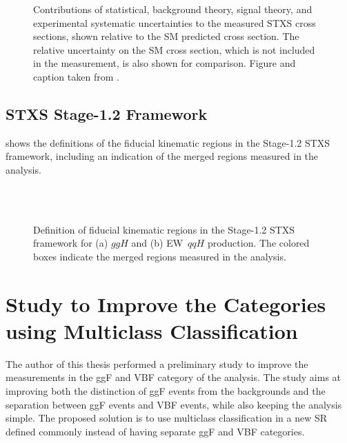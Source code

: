     \begin{figure}[h]
        \centering
        \caption[Contributions of statistical, background theory, signal theory, and experimental systematic uncertainties to the measured STXS cross sections.]{Contributions of statistical, background theory, signal theory, and experimental systematic uncertainties to the measured STXS cross sections, shown relative to the SM predicted cross section. The relative uncertainty on the SM cross section, which is not included in the measurement, is also shown for comparison.
        Figure and caption taken from .
        }
        \label{app:fig:stxs:uncertainty-breakdown}
    \end{figure}

    \clearpage
    \FloatBarrier
    \section{STXS Stage-1.2 Framework}
    \label{app:stxs-measurements-aux}

     shows the definitions of the fiducial kinematic regions in the Stage-1.2 STXS framework, including an indication of the merged regions measured in the \HWW analysis.

    \begin{figure}[h]
        \centering
         \\
         \\
        \caption[Definition of fiducial kinematic regions in the Stage-1.2 STXS framework.]{Definition of fiducial kinematic regions in the Stage-1.2 STXS framework for (a) $ggH$ and (b) EW~$qqH$ production. The colored boxes indicate the merged regions measured in the \HWW analysis.}
        \label{app:fig:stxs:stage-12-definition}
    \end{figure}


    \chapter[Study using Multiclass Classification]{Study to Improve the \TwoJet Categories using Multiclass Classification}
    \label{app:multi-class-2jet-strategy}
    The author of this thesis performed a preliminary study to improve the measurements in the ggF \TwoJet and VBF \TwoJet category of the \HWW analysis.
    The study aims at improving both the distinction of ggF \TwoJet events from the backgrounds and the separation between ggF \TwoJet events and VBF \TwoJet events, while also keeping the analysis simple.
    The proposed solution is to use multiclass classification in a new \TwoJet SR defined commonly instead of having separate ggF \TwoJet and VBF \TwoJet categories.

